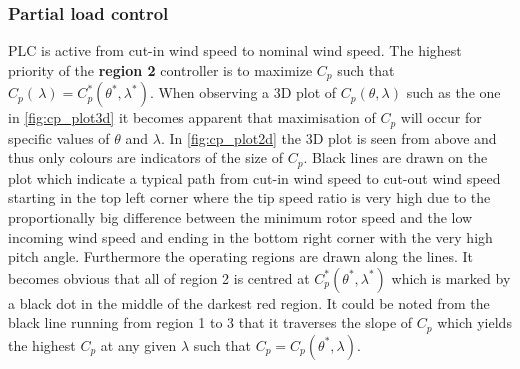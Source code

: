 \subsubsection{Partial load control} \label{sec:theory_ctrl_plc}
PLC is active from cut-in wind speed to nominal wind speed. The highest priority of the \textbf{region 2} controller is to maximize $ C_p $ such that $ C_p(\, \lambda) = C_p^*(\theta^*, \lambda^*) $. When observing a 3D plot of $ C_p(\theta, \lambda) $ such as the one in \cref{fig:cp_plot3d} it becomes apparent that maximisation of $ C_p $ will occur for specific values of $ \theta $ and $ \lambda $. In \cref{fig:cp_plot2d} the 3D plot is seen from above and thus only colours are indicators of the size of $ C_p $. Black lines are drawn on the plot which indicate a typical path from cut-in wind speed to cut-out wind speed starting in the top left corner where the tip speed ratio is very high due to the proportionally big difference between the minimum rotor speed and the low incoming wind speed and ending in the bottom right corner with the very high pitch angle. Furthermore the operating regions are drawn along the lines. It becomes obvious that all of region 2 is centred at $ C_p^*(\theta^*, \lambda^*) $ which is marked by a black dot in the middle of the darkest red region. It could be noted from the black line running from region 1 to 3 that it traverses the slope of $ C_p $ which yields the highest $ C_p $ at any given $ \lambda $ such that $ C_p = C_p(\theta^*, \lambda) $.

